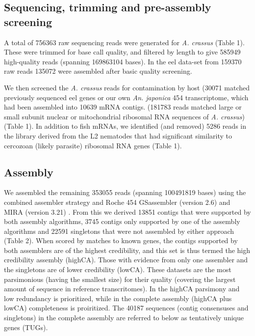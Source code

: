 \documentclass[10pt]{bmc_article}
\newenvironment{bmcformat}{\begin{raggedright}\baselineskip20pt\sloppy\setboolean{publ}{false}}{\end{raggedright}\baselineskip20pt\sloppy}
\begin{document}
\begin{bmcformat}
 \subsection*{Sequencing, trimming and pre-assembly screening}






A total of 756363 raw sequencing reads were
generated for \textit{A. crassus} (Table 1). These were trimmed for
base call quality, and filtered by length to give
585949 high-quality reads (spanning
169863104 bases). In the eel data-set from
159370 raw reads 135072 were
assembled after basic quality screening.

We then screened the \textit{A. crassus} reads for contamination by
host (30071 matched previously
sequenced eel genes or our own \textit{An. japonica} 454
transcriptome, which had been assembled into
10639 mRNA
contigs. (181783 reads matched large or
small subunit nuclear or mitochondrial ribosomal RNA sequences of
\textit{A. crassus}) (Table 1). In addition to fish mRNAs, we
identified (and removed) 5286
reads in the library derived from the L2 nematodes that had
significant similarity to cercozoan (likely parasite) ribosomal RNA
genes (Table 1).

\subsection*{Assembly}


We assembled the remaining 353055 reads (spanning
100491819 bases) using the combined assembler strategy
\cite{pmid20950480} and Roche 454 GSassembler (version 2.6) and MIRA
(version 3.21) \cite{miraEST}. From this we derived 13851
contigs that were supported by both assembly algorithms,
3745 contigs only supported by one of the assembly
algorithms and 22591 singletons that were not assembled by
either approach (Table 2). When scored by matches to known genes, the
contigs supported by both assemblers are of the highest credibility,
and this set is thus termed the high credibility assembly
(highCA). Those with evidence from only one assembler and the
singletons are of lower credibility (lowCA). These datasets are the
most parsimonious (having the smallest size) for their quality
(covering the largest amount of sequence in reference
transcritomes). In the highCA parsimony and low redundancy is
prioritized, while in the complete assembly (highCA plus lowCA)
completeness is proiritized. The 40187 sequences (contig consensuses
and singletons) in the complete assembly are referred to below as
tentatively unique genes (TUGs).





\end{bmcformat}
\end{document}
